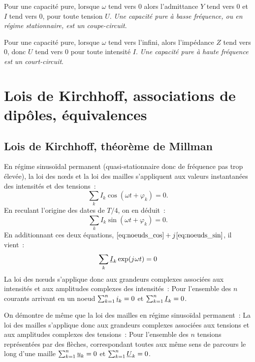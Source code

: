         Pour une capacité pure, lorsque \(\omega\) tend vers 0 alors l'admittance \(Y\) tend vers 0 et \(I\) tend vers 0, pour toute tension \(U\). \emph{Une capacité pure à basse fréquence, ou en régime stationnaire, est un coupe-circuit}.

        Pour une capacité pure, lorsque \(\omega\) tend vers l'infini, alors l'impédance \(Z\) tend vers 0, donc \(U\) tend vers 0 pour toute intensité \(I\). \emph{Une capacité pure à haute fréquence est un court-circuit}.
\section{Lois de Kirchhoff, associations de dipôles, équivalences}
    \subsection{Lois de Kirchhoff, théorème de Millman}
        En régime sinusoïdal permanent (quasi-stationnaire donc de fréquence pas trop élevée), la loi des n\oe{}ds et la loi des mailles s'appliquent aux valeurs instantanées des intensités et des tensions~:
        \begin{equation}
            \label{eq:noeuds_cos}
            \sum_{k} I_k\cos(\omega t +\varphi_k) = 0.
        \end{equation}
        En reculant l'origine des dates de \(T/4\), on en déduit~:
        \begin{equation}
            \label{eq:noeuds_sin}
            \sum_{k} I_k\sin(\omega t +\varphi_k) = 0.
        \end{equation}
        En additionnant ces deux équations, \(\eqref{eq:noeuds_cos} + {j\mkern1mu} \eqref{eq:noeuds_sin}\), il vient~:
        \begin{equation}
            \label{eq:noeuds_cplx}
            \sum_k \underline{I}_k \exp({j\mkern1mu}\omega t) = 0
        \end{equation}
        La loi des nœuds s'applique donc aux grandeurs complexes associées aux intensités et aux amplitudes complexes des intensités~: Pour l'ensemble des \(n\) courants arrivant en un noeud \(\sum_{k=1}^n \underline{i}_k = 0\) et \(\sum_{k=1}^n \underline{I}_k = 0\).

        On démontre de même que la loi des mailles en régime sinusoïdal permanent~: La loi des mailles s'applique donc aux grandeurs complexes associées aux tensions et aux amplitudes complexes des tensions~: Pour l'ensemble des \(n\) tensions représentées par des flèches, correspondant toutes aux même sens de parcours le long d'une maille \(\sum_{k=1}^n \underline{u}_k = 0\) et \(\sum_{k=1}^n \underline{U}_k = 0\).

